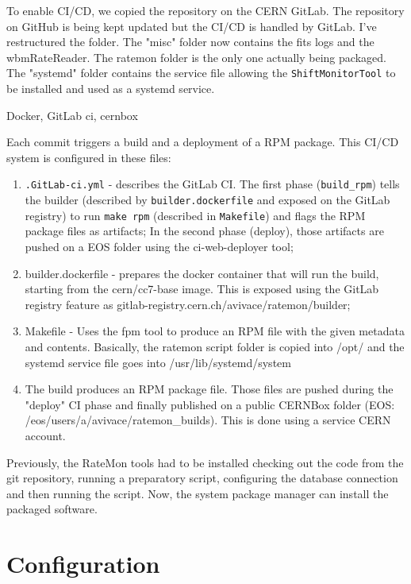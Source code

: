 To enable CI/CD, we copied the repository on the CERN GitLab. The repository on GitHub is being kept updated but the CI/CD is handled by GitLab.
I've restructured the folder. The "misc" folder now contains the fits logs and the wbmRateReader. The ratemon folder is the only one actually being packaged. The "systemd" folder contains the service file allowing the \texttt{ShiftMonitorTool} to be installed and used as a systemd service.

Docker, GitLab ci, cernbox

Each commit triggers a build and a deployment of a RPM package. This CI/CD system is configured in these files:

\begin{enumerate}
	\item \texttt{.GitLab-ci.yml} - describes the GitLab CI. The first phase (\texttt{build\_rpm}) tells the builder (described by \texttt{builder.dockerfile} and exposed on the GitLab registry) to run \texttt{make rpm} (described in \texttt{Makefile}) and flags the RPM package files as artifacts; In the second phase (deploy), those artifacts are pushed on a EOS folder using the ci-web-deployer tool;
	\item builder.dockerfile - prepares the docker container that will run the build, starting from the cern/cc7-base image. This is exposed using the GitLab registry feature as gitlab-registry.cern.ch/avivace/ratemon/builder;
	\item Makefile - Uses the fpm tool to produce an RPM file with the given metadata and contents. Basically, the ratemon script folder is copied into /opt/ and the systemd service file goes into /usr/lib/systemd/system

	\item The build produces an RPM package file. Those files are pushed during the "deploy" CI phase and finally published on a public CERNBox folder (EOS: /eos/users/a/avivace/ratemon\_builds). This is done using a service CERN account.
\end{enumerate}

Previously, the RateMon tools had to be installed checking out the code from the git repository, running a preparatory script, configuring the database connection and then running the script. Now, the system package manager can install the packaged software.

\section{Configuration}

